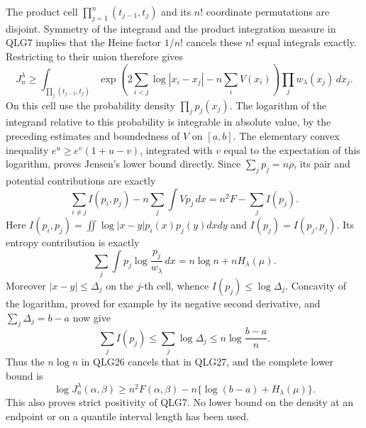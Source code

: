 The product cell \(\prod_{j=1}^n(t_{j-1},t_j)\) and its \(n!\)
coordinate permutations are disjoint. Symmetry of the integrand and the
product integration measure in QLG7 implies that the Heine factor
\(1/n!\) cancels these \(n!\) equal integrals exactly. Restricting
to their union therefore gives
\[
 J_n^\lambda\geq
 \int_{\prod_j(t_{j-1},t_j)}
 \exp\!\left(2\sum_{i<j}\log|x_i-x_j|-n\sum_iV(x_i)\right)
                       \prod_j w_\lambda(x_j)\,dx_j.
 \tag{QLG25}
\]
On this cell use the probability density \(\prod_jp_j(x_j)\).
The logarithm of the integrand relative to this probability is
integrable in absolute value, by the preceding estimates and boundedness
of \(V\) on \([a,b]\). The elementary convex inequality
\(e^u\geq e^v(1+u-v)\), integrated with
\(v\) equal to the expectation of this logarithm, proves Jensen's
lower bound directly. Since \(\sum_jp_j=n\rho\), its pair and
potential contributions are exactly
\[
 \sum_{i\ne j}I(p_i,p_j)-n\sum_j\int Vp_j\,dx
   =n^2F-\sum_j I(p_j).
\]
Here \(I(p_i,p_j)=\iint\log|x-y|p_i(x)p_j(y)dxdy\) and
\(I(p_j)=I(p_j,p_j)\). Its entropy contribution is exactly
\[
 \sum_j\int p_j\log\frac{p_j}{w_\lambda}\,dx
    =n\log n+nH_\lambda(\mu).
 \tag{QLG26}
\]
Moreover \(|x-y|\leq\Delta_j\) on the \(j\)-th cell, whence
\(I(p_j)\leq\log\Delta_j\). Concavity of the logarithm, proved
for example by its negative second derivative, and
\(\sum_j\Delta_j=b-a\) now give
\[
 \sum_jI(p_j)\leq\sum_j\log\Delta_j
       \leq n\log\frac{b-a}{n}.
 \tag{QLG27}
\]
Thus the \(n\log n\) in QLG26 cancels that in QLG27, and the complete
lower bound is
\[
 \boxed{\log J_n^\lambda(\alpha,\beta)
       \geq n^2F(\alpha,\beta)
                -n\{\log(b-a)+H_\lambda(\mu)\}.}
 \tag{QLG28}
\]
This also proves strict positivity of QLG7. No lower bound on the
density at an endpoint or on a quantile interval length has been used.

